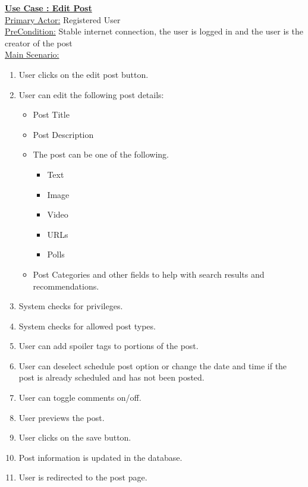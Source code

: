 \documentclass[conference,compsoc]{IEEEtran}
\newcounter{UC}
\newcommand{\nextU}{\stepcounter{UC}\theUC}
\begin{document}
\underline{\textbf{Use Case \nextU: Edit Post}}\\

\underline{Primary Actor:} Registered User\\

\underline{PreCondition:} Stable internet connection, the user is logged in and the user is the creator of the post\\

\underline{Main Scenario:}\\
\begin{enumerate}
    \item User clicks on the edit post button.
    \item User can edit the following post details:
          \begin{itemize}
              \item Post Title
              \item Post Description
              \item The post can be one of the following.
                    \begin{itemize}
                        \item Text
                        \item Image
                        \item Video
                        \item URLs
                        \item Polls
                    \end{itemize}
              \item Post Categories and other fields to help with search results and recommendations.
          \end{itemize}
    \item System checks for privileges.
    \item System checks for allowed post types.
    \item User can add spoiler tags to portions of the post.
    \item User can deselect schedule post option or change the date and time if the post is already scheduled and has not been posted.
    \item User can toggle comments on/off.
    \item User previews the post.
    \item User clicks on the save button.
    \item Post information is updated in the database.
    \item User is redirected to the post page.
\end{enumerate}
\end{document}

